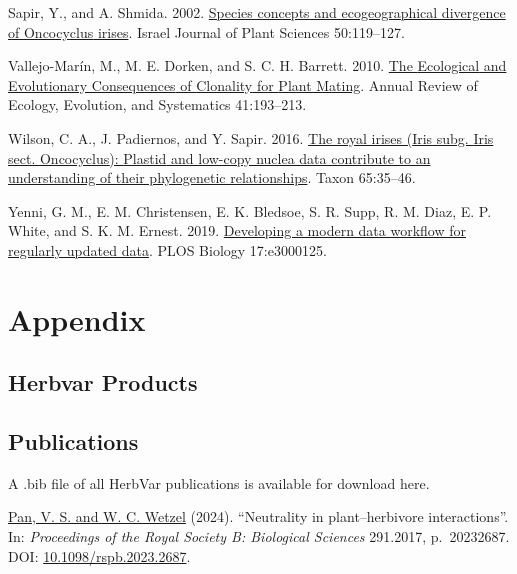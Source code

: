 \documentclass[
  letterpaper,
  DIV=11,
  numbers=noendperiod]{scrreprt}
\newlength{\cslhangindent}
\newenvironment{CSLReferences}[2] %
 {\begin{list}{}{%
  \setlength{\itemindent}{0pt}
  \setlength{\leftmargin}{0pt}
  \setlength{\parsep}{0pt}
  \ifodd #1
   \setlength{\leftmargin}{\cslhangindent}
   \setlength{\itemindent}{-1\cslhangindent}
  \fi
  \setlength{\itemsep}{#2\baselineskip}}}
 {\end{list}}
\begin{document}
\begin{CSLReferences}{1}{0}
Sapir, Y., and A. Shmida. 2002.
\href{https://doi.org/10.1560/DJXH-QX0M-5P0H-DLMW}{Species concepts and
ecogeographical divergence of {Oncocyclus} irises}. Israel Journal of
Plant Sciences 50:119--127.

Vallejo-Marín, M., M. E. Dorken, and S. C. H. Barrett. 2010.
\href{https://doi.org/10.1146/annurev.ecolsys.110308.120258}{The
{Ecological} and {Evolutionary Consequences} of {Clonality} for {Plant
Mating}}. Annual Review of Ecology, Evolution, and Systematics
41:193--213.

Wilson, C. A., J. Padiernos, and Y. Sapir. 2016.
\href{https://doi.org/10.12705/651.3}{The royal irises ({Iris} subg.
{Iris} sect. {Oncocyclus}): {Plastid} and low-copy nuclea data
contribute to an understanding of their phylogenetic relationships}.
Taxon 65:35--46.

Yenni, G. M., E. M. Christensen, E. K. Bledsoe, S. R. Supp, R. M. Diaz,
E. P. White, and S. K. M. Ernest. 2019.
\href{https://doi.org/10.1371/journal.pbio.3000125}{Developing a modern
data workflow for regularly updated data}. PLOS Biology 17:e3000125.

\end{CSLReferences}

\part{Appendix}

\chapter{Herbvar Products}\label{herbvar-products}

\chapter*{Publications}\label{publications}


A .bib file of all HerbVar publications is available for download here.

\hyperref[cite-pan_neutrality_2024]{Pan, V. S. and W. C. Wetzel} (2024).
``Neutrality in plant--herbivore interactions''. In: \emph{Proceedings
of the Royal Society B: Biological Sciences} 291.2017, p.~20232687. DOI:
\href{https://doi.org/10.1098\%2Frspb.2023.2687}{10.1098/rspb.2023.2687}.
\end{document}
